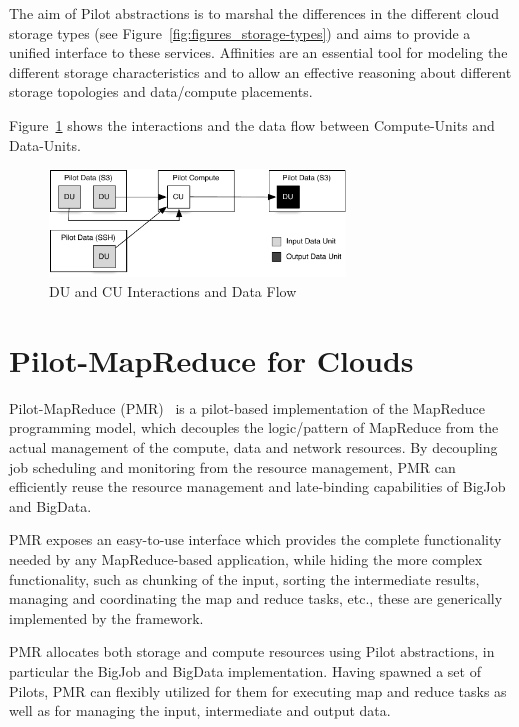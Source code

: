 \documentclass[times]{cpeauth}
\newcommand{\pilot}{Pilot\xspace}
\newcommand{\pilots}{Pilots\xspace}
\newcommand{\computeunits}{Compute-Units\xspace}
\newcommand{\dataunits}{Data-Units\xspace}
\begin{document}
The aim of Pilot abstractions is to marshal the differences in the different 
cloud storage types (see Figure~\ref{fig:figures_storage-types}) and aims to 
provide a unified interface to these services. Affinities are an essential 
tool for modeling the different storage characteristics and to allow an 
effective reasoning about different storage topologies and data/compute 
placements.


Figure~\ref{fig:figures_data-flow} shows the interactions and the data flow 
between \computeunits and \dataunits.
\begin{figure}[htbp]
	\centering
		\includegraphics[width=0.7\textwidth]{figures/data-flow.pdf}
	\caption{DU and CU Interactions and Data Flow}
	\label{fig:figures_data-flow}
\end{figure}



\section{Pilot-MapReduce for Clouds}

Pilot-MapReduce (PMR)~\cite{Mantha:2012:PEF:2287016.2287020} is a pilot-based
implementation of the MapReduce programming model, which decouples the
logic/pattern of MapReduce from the actual management of the compute, data and
network resources. By decoupling job scheduling and monitoring from the
resource management, PMR can efficiently reuse the resource management and
late-binding capabilities of BigJob and BigData.

PMR exposes an easy-to-use interface which provides the complete
functionality needed by any MapReduce-based application, while hiding
the more complex functionality, such as chunking of the input, sorting
the intermediate results, managing and coordinating the map and reduce
tasks, etc., these are generically implemented by the
framework.

PMR allocates both storage and compute resources using \pilot abstractions, in
particular the BigJob and BigData implementation. Having spawned a set of
\pilots, PMR can flexibly utilized for them for executing map and reduce tasks
as well as for managing the input, intermediate and output data.
\end{document}

